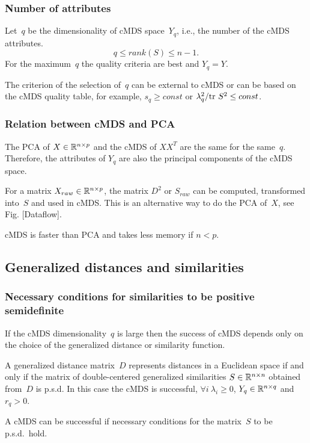 \documentclass[10pt,a4paper]{article}
\begin{document}
\subsubsection {Number of attributes}

Let~$q$ be the dimensionality of cMDS space~$Y_q$, i.e., the number of the cMDS attributes. 
$$q \le rank(S) \le n - 1.$$
For the maximum~$q$ the quality criteria are best and $Y_q = Y$.

The criterion of the selection of~$q$ can be external to cMDS
or can be based on the cMDS quality table, for example, $s_q \ge const$ or $\lambda_q^2 / \mathrm {tr} \  S^2 \le const$.


\subsubsection {Relation between cMDS and PCA}

The PCA of $X \in \mathbb R^{n \times p}$ and the cMDS of $X X^T$ are the same for the same~$q$. 
Therefore, the attributes of $Y_q$ are also the principal components of the cMDS space.

For a matrix $X_{raw} \in \mathbb R^{n \times p}$, the matrix $D^2$ or $S_{raw}$ can be computed, transformed into~$S$ and used in cMDS. 
This is an alternative way to do the PCA of~$X$, see Fig. [Dataflow].

cMDS is faster than PCA and takes less memory if $n < p$.


\subsection {Generalized distances and similarities}

\subsubsection {Necessary conditions for similarities to be positive semidefinite}

If the cMDS dimensionality~$q$ is large 
then the success of cMDS depends only on the choice of the generalized distance or similarity function.

A generalized distance matrix~$D$ represents distances in a Euclidean space 
if and only if the matrix of double-centered generalized similarities $S \in \mathbb R^{n \times n}$ obtained from~$D$ is p.s.d. 
In this case the cMDS is successful, $\forall i \ \lambda_i \ge 0$, $Y_q \in \mathbb R^{n \times q}$ and $r_q > 0$. 

A cMDS can be successful if necessary conditions for the matrix~$S$ to be p.s.d.~hold.
\end{document}
